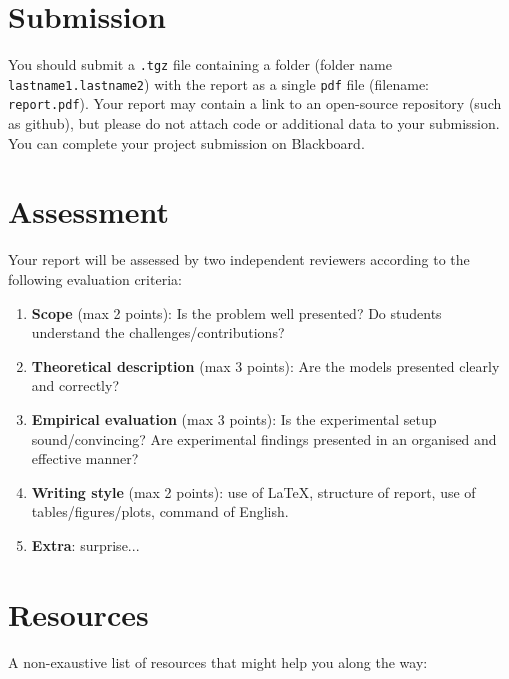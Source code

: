 \section{Submission}

You should submit a \texttt{.tgz} file containing a folder (folder name {\tt lastname1.lastname2}) with the report as a single \texttt{pdf} file (filename: {\tt report.pdf}).
Your report may contain a link to an open-source repository (such as github), but please do not attach code or additional data to your submission. You can complete your project submission on Blackboard.

\section{Assessment}

Your report will be assessed by two independent reviewers according to the following evaluation criteria:
\begin{enumerate}
	\item \textbf{Scope} (max 2 points): Is the problem well presented? Do students understand the challenges/contributions?
	\item \textbf{Theoretical description} (max 3 points): Are the models presented clearly and correctly?
	\item \textbf{Empirical evaluation} (max 3 points): Is the experimental setup sound/convincing? Are experimental findings presented in an organised and effective manner? 
	\item \textbf{Writing style} (max 2 points): use of \LaTeX , structure of report, use of tables/figures/plots, command of English.
	\item \textbf{Extra}: surprise...
\end{enumerate}




\section{Resources}

A non-exaustive list of resources that might help you along the way:

